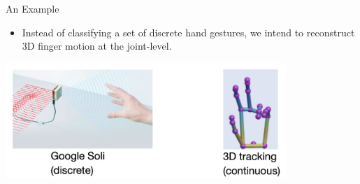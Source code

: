 \documentclass[dvipsnames, handout]{beamer}
\newcommand{\1}{\mathds{1}}	%
\begin{document}
\begin{frame}[t]{An Example}
\begin{itemize}
\item Instead of classifying a set of discrete hand gestures, we intend to reconstruct 3D finger motion at the joint-level.
\end{itemize}
\begin{center}
\includegraphics[width=0.8\textwidth]{imgs/example-3d-finger-motion.jpg}
\end{center}
\end{frame}
\end{document}
